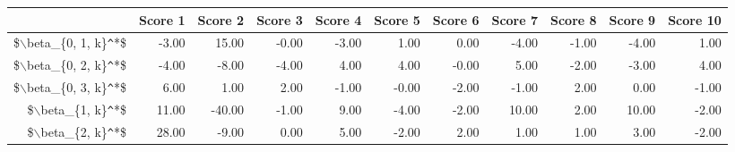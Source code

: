 \begin{table}[ht]
\centering
\begin{tabular}{rrrrrrrrrrr}
  \hline
 & Score 1 & Score 2 & Score 3 & Score 4 & Score 5 & Score 6 & Score 7 & Score 8 & Score 9 & Score 10 \\ 
  \hline
\$$\backslash$beta\_\{0, 1, k\}\verb|^|*\$ & -3.00 & 15.00 & -0.00 & -3.00 & 1.00 & 0.00 & -4.00 & -1.00 & -4.00 & 1.00 \\ 
  \$$\backslash$beta\_\{0, 2, k\}\verb|^|*\$ & -4.00 & -8.00 & -4.00 & 4.00 & 4.00 & -0.00 & 5.00 & -2.00 & -3.00 & 4.00 \\ 
  \$$\backslash$beta\_\{0, 3, k\}\verb|^|*\$ & 6.00 & 1.00 & 2.00 & -1.00 & -0.00 & -2.00 & -1.00 & 2.00 & 0.00 & -1.00 \\ 
  \$$\backslash$beta\_\{1, k\}\verb|^|*\$ & 11.00 & -40.00 & -1.00 & 9.00 & -4.00 & -2.00 & 10.00 & 2.00 & 10.00 & -2.00 \\ 
  \$$\backslash$beta\_\{2, k\}\verb|^|*\$ & 28.00 & -9.00 & 0.00 & 5.00 & -2.00 & 2.00 & 1.00 & 1.00 & 3.00 & -2.00 \\ 
   \hline
\end{tabular}
\end{table}
